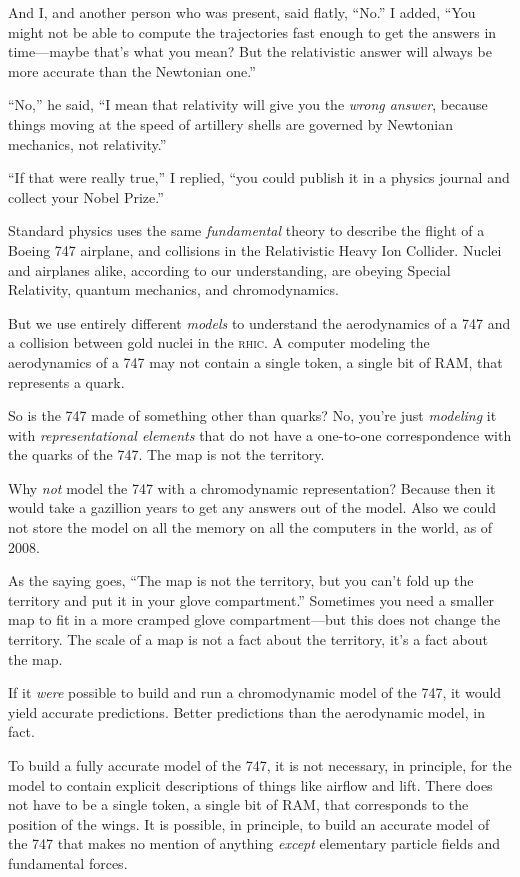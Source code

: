 {
 And I, and another person who was present, said flatly,
``No.'' I added,
``You might not be able to compute the trajectories
fast enough to get the answers in time---maybe that's
what you mean? But the relativistic answer will always be more accurate
than the Newtonian one.''}

{
 ``No,'' he said,
``I mean that relativity will give you the
\textit{wrong answer}, because things moving at the speed of artillery
shells are governed by Newtonian mechanics, not
relativity.''}

{
 ``If that were really true,'' I
replied, ``you could publish it in a physics journal
and collect your Nobel Prize.''}

{
 Standard physics uses the same \textit{fundamental} theory to
describe the flight of a Boeing 747 airplane, and collisions in the
Relativistic Heavy Ion Collider. Nuclei and airplanes alike, according
to our understanding, are obeying Special Relativity, quantum
mechanics, and chromodynamics.}

{
 But we use entirely different \textit{models} to understand the
aerodynamics of a 747 and a collision between gold nuclei in the \textsc{rhic}.
A computer modeling the aerodynamics of a 747 may not contain a single
token, a single bit of RAM, that represents a quark.}

{
 So is the 747 made of something other than quarks? No,
you're just \textit{modeling} it with
\textit{representational elements} that do not have a one-to-one
correspondence with the quarks of the 747. The map is not the
territory.}

{
 Why \textit{not} model the 747 with a chromodynamic
representation? Because then it would take a gazillion years to get any
answers out of the model. Also we could not store the model on all the
memory on all the computers in the world, as of 2008.}

{
 As the saying goes, ``The map is not the
territory, but you can't fold up the territory and put
it in your glove compartment.'' Sometimes you need a
smaller map to fit in a more cramped glove compartment---but this does
not change the territory. The scale of a map is not a fact about the
territory, it's a fact about the map.}

{
 If it \textit{were} possible to build and run a chromodynamic
model of the 747, it would yield accurate predictions. Better
predictions than the aerodynamic model, in fact.}

{
 To build a fully accurate model of the 747, it is not necessary,
in principle, for the model to contain explicit descriptions of things
like airflow and lift. There does not have to be a single token, a
single bit of RAM, that corresponds to the position of the wings. It is
possible, in principle, to build an accurate model of the 747 that
makes no mention of anything \textit{except} elementary particle fields
and fundamental forces.}

